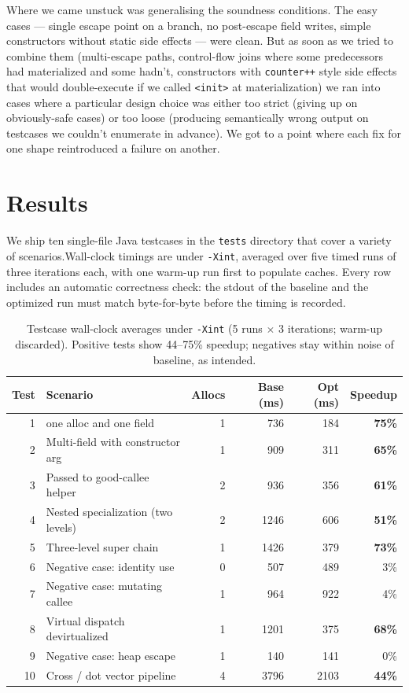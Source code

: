 \documentclass[12pt,a4paper]{article}
\begin{document}
Where we came unstuck was generalising the soundness conditions. The
easy cases — single escape point on a branch, no post-escape field writes,
simple constructors without static side effects — were clean. But as soon
as we tried to combine them (multi-escape paths, control-flow joins where
some predecessors had materialized and some hadn't, constructors with
\texttt{counter++} style side effects that would double-execute if we called
\texttt{<init>} at materialization) we ran into cases where a particular design
choice was either too strict (giving up on obviously-safe cases) or too
loose (producing semantically wrong output on testcases we couldn't
enumerate in advance). We got to a point where each fix for one shape
reintroduced a failure on another.

\section{Results}

 We ship ten single-file Java testcases in the \texttt{tests} directory that cover a variety of scenarios.Wall-clock timings
 are under \texttt{-Xint}, averaged over five timed runs of three iterations each, with one warm-up run first to populate caches. Every row
 includes an automatic correctness check: the stdout of the baseline and
 the optimized run must match byte-for-byte before the timing is recorded.

 \begin{table}[h!]
 \centering
 \small
 \begin{tabular}{r l r r r r}
 \toprule
 \textbf{Test} & \textbf{Scenario} & \textbf{Allocs} & \textbf{Base (ms)} & \textbf{Opt (ms)} & \textbf{Speedup} \\
 \midrule
 1  & one alloc and one field        & 1 &  736 &  184 & \textbf{75\%} \\
 2  & Multi-field with constructor arg            & 1 &  909 &  311 & \textbf{65\%} \\
 3  & Passed to good-callee helper             & 2 &  936 &  356 & \textbf{61\%} \\
 4  & Nested specialization (two levels)       & 2 & 1246 &  606 & \textbf{51\%} \\
 5  & Three-level super chain                  & 1 & 1426 &  379 & \textbf{73\%} \\
 6  & Negative case: identity use                & 0 &  507 &  489 & 3\% \\
 7  & Negative case: mutating callee             & 1 &  964 &  922 & 4\% \\
 8  & Virtual dispatch devirtualized           & 1 & 1201 &  375 & \textbf{68\%} \\
 9  & Negative case: heap escape                 & 1 &  140 &  141 & 0\% \\
 10 & Cross / dot vector pipeline              & 4 & 3796 & 2103 & \textbf{44\%} \\
 \bottomrule
 \end{tabular}
 \caption{Testcase wall-clock averages under \texttt{-Xint} (5 runs
 $\times$ 3 iterations; warm-up discarded). Positive tests show 44--75\%
 speedup; negatives stay within noise of baseline, as intended.}
 \end{table}
\end{document}
